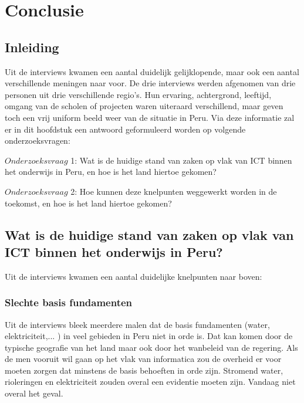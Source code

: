 

\chapter{Conclusie}
\label{ch:conclusie}


\section{Inleiding}
Uit de interviews kwamen een aantal duidelijk gelijklopende, maar ook een aantal verschillende meningen naar voor. De drie interviews werden afgenomen van drie personen uit drie verschillende regio's. Hun ervaring, achtergrond, leeftijd, omgang van de scholen of projecten waren uiteraard verschillend, maar geven toch een vrij uniform beeld weer van de situatie in Peru. Via deze informatie zal er in dit hoofdstuk een antwoord geformuleerd worden op volgende onderzoeksvragen:

$Onderzoeksvraag$ 1: Wat is de huidige stand van zaken op vlak van ICT binnen het onderwijs in Peru, en hoe is het land hiertoe gekomen?

$Onderzoeksvraag$ 2: Hoe kunnen deze knelpunten weggewerkt worden in de toekomst, en hoe is het land hiertoe gekomen?

\section{Wat is de huidige stand van zaken op vlak van ICT binnen het onderwijs in Peru?}
Uit de interviews kwamen een aantal duidelijke knelpunten naar boven:



\subsection{Slechte basis fundamenten}
Uit de interviews bleek meerdere malen dat de basis fundamenten (water, elektriciteit,... ) in veel gebieden in Peru niet in orde is. Dat kan komen door de typische geografie van het land maar ook door het wanbeleid van de regering. Als de men vooruit wil gaan op het vlak van informatica zou de overheid er voor moeten zorgen dat minstens de basis behoeften in orde zijn. Stromend water, rioleringen en elektriciteit zouden overal een evidentie moeten zijn. Vandaag niet overal het geval.

